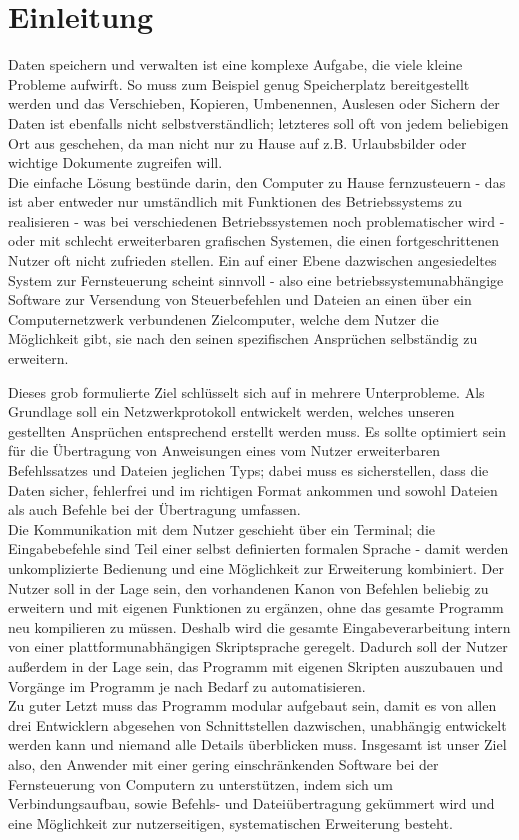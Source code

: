 %

%
\section*{Einleitung}
Daten speichern und verwalten ist eine komplexe Aufgabe, die viele kleine Probleme aufwirft. So muss zum Beispiel genug Speicherplatz bereitgestellt werden und das Verschieben, Kopieren, Umbenennen, Auslesen oder Sichern der Daten ist ebenfalls nicht selbstverständlich; letzteres soll oft von jedem beliebigen Ort aus geschehen, da man nicht nur zu Hause auf z.B. Urlaubsbilder oder wichtige Dokumente zugreifen will.\\
Die einfache Lösung bestünde darin, den Computer zu Hause fernzusteuern - das ist aber entweder nur umständlich mit Funktionen des Betriebssystems zu realisieren - was bei verschiedenen Betriebssystemen noch problematischer wird - oder mit schlecht erweiterbaren grafischen Systemen, die einen fortgeschrittenen Nutzer oft nicht zufrieden stellen.
Ein auf einer Ebene dazwischen angesiedeltes System zur Fernsteuerung scheint sinnvoll - also eine betriebssystemunabhängige Software zur Versendung von Steuerbefehlen und Dateien an einen über ein Computernetzwerk verbundenen Zielcomputer, welche dem Nutzer die Möglichkeit gibt, sie nach den seinen spezifischen Ansprüchen selbständig zu erweitern.

Dieses grob formulierte Ziel schlüsselt sich auf in mehrere Unterprobleme. Als Grundlage soll ein Netzwerkprotokoll entwickelt werden, welches unseren gestellten Ansprüchen entsprechend erstellt werden muss. 
Es sollte optimiert sein für die Übertragung von Anweisungen eines vom Nutzer erweiterbaren Befehlssatzes und Dateien jeglichen Typs; dabei muss es sicherstellen, dass die Daten sicher, fehlerfrei und im richtigen Format ankommen und sowohl Dateien als auch Befehle bei der Übertragung umfassen.\\
Die Kommunikation mit dem Nutzer geschieht über ein Terminal; die Eingabebefehle sind Teil einer selbst definierten formalen Sprache - damit werden unkomplizierte Bedienung und eine Möglichkeit zur Erweiterung kombiniert.
Der Nutzer soll in der Lage sein, den vorhandenen Kanon von Befehlen beliebig zu erweitern und mit eigenen Funktionen zu ergänzen, ohne das gesamte Programm neu kompilieren zu müssen. Deshalb wird die gesamte Eingabeverarbeitung intern von einer plattformunabhängigen Skriptsprache geregelt.
Dadurch soll der Nutzer außerdem in der Lage sein, das Programm mit eigenen Skripten auszubauen und Vorgänge im Programm je nach Bedarf zu automatisieren.\\
Zu guter Letzt muss das Programm modular aufgebaut sein, damit es von allen drei Entwicklern abgesehen von Schnittstellen dazwischen, unabhängig entwickelt werden kann und niemand alle Details überblicken muss.
Insgesamt ist unser Ziel also, den Anwender mit einer gering einschränkenden Software bei der Fernsteuerung von Computern zu unterstützen, indem sich um Verbindungsaufbau, sowie Befehls- und Dateiübertragung gekümmert wird und eine Möglichkeit zur nutzerseitigen, systematischen Erweiterung besteht.
%